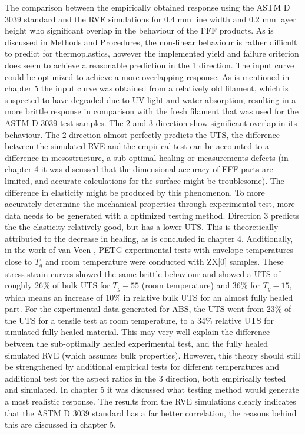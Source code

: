The comparison between the empirically obtained response using the ASTM D 3039 standard and the RVE simulations for 0.4 mm line width and 0.2 mm layer height who significant overlap in the behaviour of the FFF products. As is discussed in Methods and Procedures, the non-linear behaviour is rather difficult to predict for thermoplastics, however the implemented yield and failure criterion does seem to achieve a reasonable prediction in the 1 direction. The input curve could be optimized to achieve a more overlapping response. As is mentioned in chapter 5 the input curve was obtained from a relatively old filament, which is suspected to have degraded due to UV light and water absorption, resulting in a more brittle response in comparison with the fresh filament that was used for the ASTM D 3039 test samples.
The 2 and 3 direction show significant overlap in its behaviour. The 2 direction almost perfectly predicts the UTS, the difference between the simulated RVE and the empirical test can be accounted to a difference in mesostructure, a sub optimal healing or measurements defects (in chapter 4 it was discussed that the dimensional accuracy of FFF parts are limited, and accurate calculations for the surface might be troublesome). The difference in elasticity might be produced by this phenomenon. To more accurately determine the mechanical properties through experimental test, more data needs to be generated with a optimized testing method. 
Direction 3 predicts the the elasticity relatively good, but has a lower UTS. This is theoretically attributed to the decrease in healing, as is concluded in chapter 4. Additionally, in the work of van Veen \cite{Veen2019EnhancingTemperature}, PETG experimental tests with envelope temperatures close to $T_g$ and room temperature were conducted with ZX[0] samples. These stress strain curves showed the same brittle behaviour and showed a UTS of roughly 26\% of bulk UTS for $T_g-55$ (room temperature) and 36\% for $T_g-15$, which means an increase of 10\% in relative bulk UTS for an almost fully healed part. For the experimental data generated for ABS, the UTS went from 23\% of the UTS for a tensile test at room temperature, to a  34\% relative UTS for simulated fully healed material. This may very well explain the difference between the sub-optimally healed experimental test, and the fully healed simulated RVE (which assumes bulk properties). However, this theory should still be strengthened by additional empirical tests for different temperatures and additional test for the aspect ratios in the 3 direction, both empirically tested and simulated. 
In chapter 5 it was discussed what testing method would generate a most realistic response. The results from the RVE simulations clearly indicates that the ASTM D 3039 standard has a far better correlation, the reasons behind this are discussed in chapter 5.

